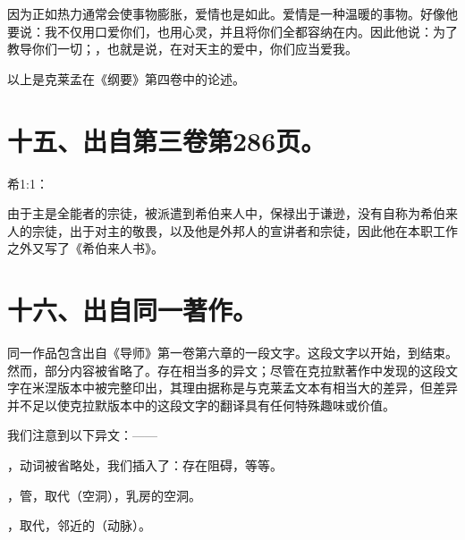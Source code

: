 因为正如热力通常会使事物膨胀，爱情也是如此。爱情是一种温暖的事物。好像他要说：我不仅用口爱你们，也用心灵，并且将你们全都容纳在内。因此他说：为了教导你们一切；，也就是说，在对天主的爱中，你们应当爱我。\par

以上是克莱孟在《纲要》第四卷中的论述。\par


\section{十五、出自第三卷第286页。}

希1:1：\par

由于主是全能者的宗徒，被派遣到希伯来人中，保禄出于谦逊，没有自称为希伯来人的宗徒，出于对主的敬畏，以及他是外邦人的宣讲者和宗徒，因此他在本职工作之外又写了《希伯来人书》。\par


\section{十六、出自同一著作。}

同一作品包含出自《导师》第一卷第六章的一段文字。这段文字以开始，到结束。然而，部分内容被省略了。存在相当多的异文；尽管在克拉默著作中发现的这段文字在米涅版本中被完整印出，其理由据称是与克莱孟文本有相当大的差异，但差异并不足以使克拉默版本中的这段文字的翻译具有任何特殊趣味或价值。\par

我们注意到以下异文：——\par

，动词被省略处，我们插入了：存在阻碍，等等。\par

，管，取代（空洞），乳房的空洞。\par

，取代，邻近的（动脉）。\par


